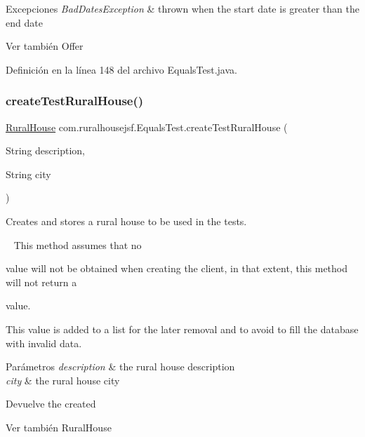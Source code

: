 \begin{DoxyExceptions}{Excepciones}
{\em Bad\+Dates\+Exception} & thrown when the start date is greater than the end date\\
\hline
\end{DoxyExceptions}
\begin{DoxySeeAlso}{Ver también}
Offer 
\end{DoxySeeAlso}


Definición en la línea 148 del archivo Equals\+Test.\+java.

\mbox{\label{a00248_aaee652d5b230a23c765bd95b9691056b}} 
\subsubsection{\texorpdfstring{createTestRuralHouse()}{createTestRuralHouse()}}
{\footnotesize\ttfamily \mbox{\hyperlink{a00188}{Rural\+House}} com.\+ruralhousejsf.\+Equals\+Test.\+create\+Test\+Rural\+House (\begin{DoxyParamCaption}\item[{String}]{description,  }\item[{String}]{city }\end{DoxyParamCaption})\hspace{0.3cm}{\ttfamily [private]}}



Creates and stores a rural house to be used in the tests. 

~\newline
 This method assumes that no
\begin{DoxyCode}{0}
\DoxyCodeLine{\textcolor{keyword}{null} }
\end{DoxyCode}
 value will not be obtained when creating the client, in that extent, this method will not return a 
\begin{DoxyCode}{0}
\DoxyCodeLine{\textcolor{keyword}{null} }
\end{DoxyCode}
 value. 

This value is added to a list for the later removal and to avoid to fill the database with invalid data.


\begin{DoxyParams}{Parámetros}
{\em description} & the rural house description \\
\hline
{\em city} & the rural house city\\
\hline
\end{DoxyParams}
\begin{DoxyReturn}{Devuelve}
the created
\begin{DoxyCode}{0}
\end{DoxyCode}

\end{DoxyReturn}
\begin{DoxySeeAlso}{Ver también}
Rural\+House 
\end{DoxySeeAlso}



